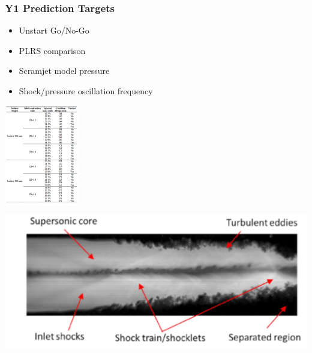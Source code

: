 \documentclass{beamer}
\begin{document}
\begin{frame}\frametitle{Y1 Prediction Targets}

\begin{minipage}{0.49\textwidth}
\begin{itemize}
\item Unstart Go/No-Go
\item PLRS comparison
\end{itemize}

\begin{itemize}
\item Scramjet model pressure
\item Shock/pressure oscillation frequency
\end{itemize}
\end{minipage}
\begin{minipage}{0.49\textwidth}
\centering
\includegraphics[height=1.7in]{Figures/Go-NoGo.pdf}
\end{minipage}

\centering
\includegraphics[width=.7\textwidth]{Figures/PLRS-1.pdf}

\end{frame}



\end{document}
